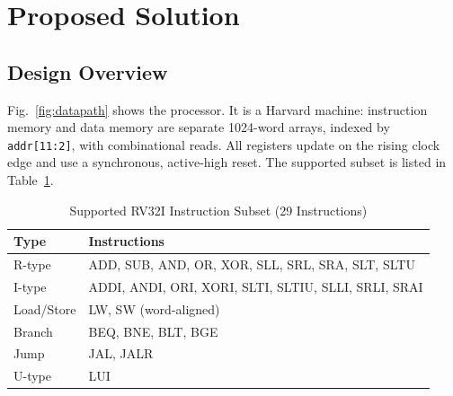 \section{Proposed Solution}

\subsection{Design Overview}
Fig.~\ref{fig:datapath} shows the processor. It is a Harvard machine: instruction memory
and data memory are separate 1024-word arrays, indexed by \texttt{addr[11:2]}, with
combinational reads. All registers update on the rising clock edge and use a
synchronous, active-high reset. The supported subset is listed in Table~\ref{tab:isa}.

\begin{table}[!t]
\centering
\caption{Supported RV32I Instruction Subset (29 Instructions)}
\label{tab:isa}
\renewcommand{\arraystretch}{1.1}
\begin{tabular}{@{}p{1.5cm}p{6.2cm}@{}}
\toprule
\textbf{Type} & \textbf{Instructions} \\ \midrule
R-type   & ADD, SUB, AND, OR, XOR, SLL, SRL, SRA, SLT, SLTU \\
I-type   & ADDI, ANDI, ORI, XORI, SLTI, SLTIU, SLLI, SRLI, SRAI \\
Load/Store & LW, SW (word-aligned) \\
Branch   & BEQ, BNE, BLT, BGE \\
Jump     & JAL, JALR \\
U-type   & LUI \\ \bottomrule
\end{tabular}
\end{table}

